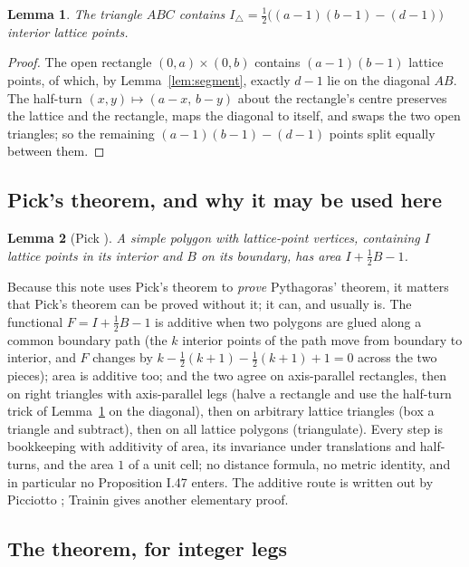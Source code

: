 \documentclass[11pt,a4paper]{article}
\newtheorem{lemma}{Lemma}
\theoremstyle{remark}
\begin{document}
\begin{lemma}\label{lem:triangle}
The triangle $ABC$ contains $I_{\triangle}=\tfrac12\bigl((a-1)(b-1)-(d-1)\bigr)$
interior lattice points.
\end{lemma}

\begin{proof}
The open rectangle $(0,a)\times(0,b)$ contains $(a-1)(b-1)$ lattice points, of
which, by Lemma~\ref{lem:segment}, exactly $d-1$ lie on the diagonal $AB$. The
half-turn $(x,y)\mapsto(a-x,\,b-y)$ about the rectangle's centre preserves the
lattice and the rectangle, maps the diagonal to itself, and swaps the two open
triangles; so the remaining $(a-1)(b-1)-(d-1)$ points split equally between
them.
\end{proof}

\subsection*{Pick's theorem, and why it may be used here}

\begin{lemma}[Pick \cite{pick}]\label{lem:pick}
A simple polygon with lattice-point vertices, containing $I$ lattice points in
its interior and $B$ on its boundary, has area $I+\tfrac12 B-1$.
\end{lemma}

Because this note uses Pick's theorem to \emph{prove} Pythagoras' theorem, it
matters that Pick's theorem can be proved without it; it can, and usually is.
The functional $F=I+\tfrac12B-1$ is additive when two polygons are glued along
a common boundary path (the $k$ interior points of the path move from boundary
to interior, and $F$ changes by $k-\tfrac12(k+1)-\tfrac12(k+1)+1=0$ across the
two pieces); area is additive too; and the two agree on axis-parallel
rectangles, then on right triangles with axis-parallel legs (halve a rectangle
and use the half-turn trick of Lemma~\ref{lem:triangle} on the diagonal), then
on arbitrary lattice triangles (box a triangle and subtract), then on all
lattice polygons (triangulate). Every step is bookkeeping with additivity of
area, its invariance under translations and half-turns, and the area $1$ of a
unit cell; no distance formula, no metric identity, and in particular no
Proposition I.47 enters. The additive route is written out by Picciotto
\cite{picciotto-pick}; Trainin \cite{trainin} gives another elementary proof.

\subsection*{The theorem, for integer legs}
\end{document}
